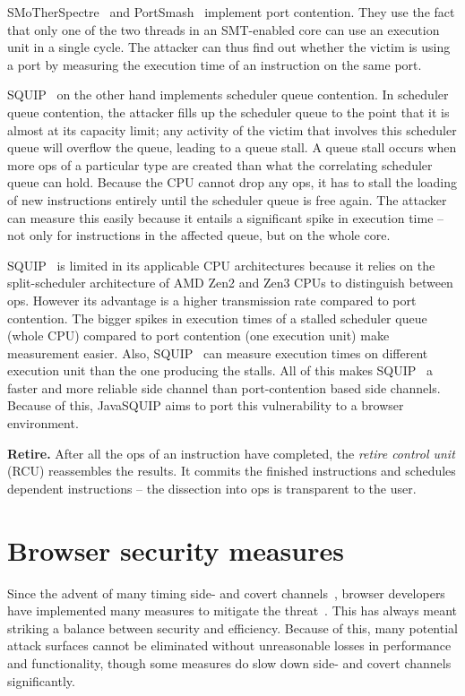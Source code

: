 \documentclass[11pt,
  titlepage=false,
]{scrreprt}
\begin{document}
SMoTherSpectre~\cite{Bhattacharyya2019} and PortSmash~\cite{Aldaya2019port} implement port contention.
They use the fact that only one of the two threads in an SMT-enabled core can use an execution unit in a single cycle.
The attacker can thus find out whether the victim is using a port by measuring the execution time of an instruction on the same port.

SQUIP~\cite{squip} on the other hand implements scheduler queue contention.
In scheduler queue contention, the attacker fills up the scheduler queue to the point that it is almost at its capacity limit;
any activity of the victim that involves this scheduler queue will overflow the queue, leading to a queue stall.
A queue stall occurs when more \textmu ops of a particular type are created than what the correlating scheduler queue can hold.
Because the CPU cannot drop any \textmu ops, it has to stall the loading of new instructions entirely until the scheduler queue is free again.
The attacker can measure this easily because it entails a significant spike in execution time --
not only for instructions in the affected queue, but on the whole core.

SQUIP~\cite{squip} is limited in its applicable CPU architectures because it relies on the split-scheduler architecture of AMD Zen2 and Zen3 CPUs to distinguish between \textmu ops.
However its advantage is a higher transmission rate compared to port contention.
The bigger spikes in execution times of a stalled scheduler queue (whole CPU) compared to port contention (one execution unit) make measurement easier.
Also, SQUIP~\cite{squip} can measure execution times on different execution unit than the one producing the stalls.
All of this makes SQUIP~\cite{squip} a faster and more reliable side channel than port-contention based side channels.
Because of this, JavaSQUIP aims to port this vulnerability to a browser environment.


\textbf{Retire.}
After all the \textmu ops of an instruction have completed, the \textit{retire control unit} (RCU) reassembles the results.
It commits the finished instructions and schedules dependent instructions -- the dissection into \textmu ops is transparent to the user.


\section{Browser security measures}
\label{sec:browsersecurity}
Since the advent of many timing side- and covert channels~\cite{noack2018exploiting, Rokicki2022webport, gruss2016rowhammer},
browser developers have implemented many measures to mitigate the threat~\cite{shusterman2021prime, performancenow, performancenowchrome}.
This has always meant striking a balance between security and efficiency.
Because of this, many potential attack surfaces cannot be eliminated without unreasonable losses in performance and functionality,
though some measures do slow down side- and covert channels significantly.
\end{document}
